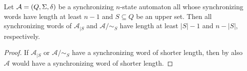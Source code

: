 \begin{corollary} \label{lem:sub-quotient-extremal-linear}
	Let $\mathcal A = (Q, \Sigma, \delta)$
	be a synchronizing $n$-state automaton
	all whose synchronizing words have length at least $n - 1$
	and $S \subseteq Q$ be an upper set. 	
	Then all synchronizing words 
	of $\mathcal A_{|S}$ and $\mathcal A / {\sim_S}$
	have length at least $|S| - 1$
	and $n - |S|$, respectively.
\end{corollary}
\begin{proof}
	If $\mathcal A_{|S}$
	or $\mathcal A / {\sim_S}$
	have a synchronizing word
	of shorter length,
	then by 
	also $\mathcal A$ would have a synchronizing
	word of shorter length.	
\end{proof}